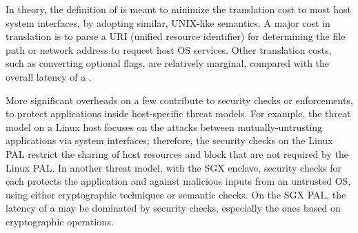 In theory, the definition of \thehostabi{}
is meant to minimize the translation cost to most host system interfaces,
by adopting similar, UNIX-like semantics.
A major cost
in translation is to parse a URI (unified resource identifier)
for determining the file path or network address
to request host OS services.
Other translation costs,
such as converting optional flags,
are relatively marginal, compared with the overall latency of a \hostapi{}.



More significant overheads
on a few \hostapis{} contribute to security checks or enforcements,
to protect applications
inside host-specific threat models.
For example, the threat model on a Linux host
focuses on the attacks between mutually-untrusting applications via system interfaces;
therefore,
the security checks on the Linux PAL
restrict the sharing of host resources and block \linuxapis{} that are not required by the Linux PAL.
In another threat model, with the SGX enclave, 
security checks for each \hostapi{}
protects the application and \libos{} against malicious inputs from an untrusted OS,
using either cryptographic techniques or semantic checks.
On the SGX PAL, the latency of a \hostapi{} may be dominated
by security checks,
especially the ones based on cryptographic operations.


